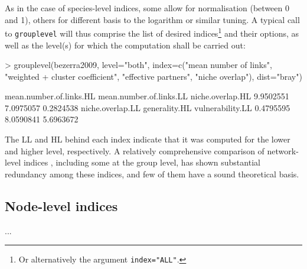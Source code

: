 \documentclass[a4paper, 11pt]{article}
\begin{document}
\noindent As in the case of species-level indices, some allow for normalisation (between 0 and 1), others for different basis to the logarithm or similar tuning. A typical call to \texttt{grouplevel} will thus comprise the list of desired indices\footnote{Or alternatively the argument \texttt{index="ALL"}.} and their options, as well as the level(s) for which the computation shall be carried out:
\begin{Schunk}
\begin{Sinput}
> grouplevel(bezerra2009, level="both", index=c("mean number of links", "weighted 
+      cluster coefficient", "effective partners", "niche overlap"), dist="bray")
\end{Sinput}
\begin{Soutput}
mean.number.of.links.HL mean.number.of.links.LL        niche.overlap.HL 
              9.9502551               7.0975057               0.2824538 
       niche.overlap.LL           generality.HL        vulnerability.LL 
              0.4795595               8.0590841               5.6963672 
\end{Soutput}
\end{Schunk}
The LL and HL behind each index indicate that it was computed for the lower and higher level, respectively. A relatively comprehensive comparison of network-level indices \citep{Dormann2009}, including some at the group level, has shown substantial redundancy among these indices, and few of them have a sound theoretical basis.



\subsection{Node-level indices}\label{nodelevel}
...
\end{document}
